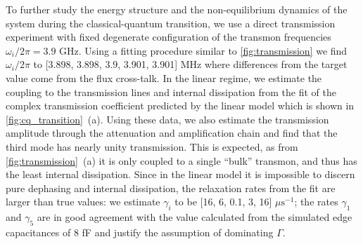\documentclass[%
 aps, prl,
 amsmath,amssymb,
 reprint,%
superscriptaddress
]{revtex4-2}
\begin{document}
To further study the energy structure and the non-equilibrium dynamics of the system during the classical-quantum transition, we use a direct transmission experiment with fixed degenerate configuration of the transmon frequencies $\omega_i/2\pi = 3.9$ GHz. Using a fitting procedure similar to \autoref{fig:transmission} we find $\omega_i/2\pi$ to [3.898, 3.898, 3.9, 3.901, 3.901] MHz where differences from the target value come from the flux cross-talk. In the linear regime, we estimate the coupling to the transmission lines and internal dissipation from the fit of the complex transmission coefficient predicted by the linear model which is shown in \autoref{fig:cq_transition}~(a). Using these data, we also estimate the transmission amplitude through the attenuation and amplification chain and find that the third mode has nearly unity transmission. This is expected, as from \autoref{fig:transmission}~(a) it is only coupled to a single ``bulk'' transmon, and thus has the least internal dissipation. Since in the linear model it is impossible to discern pure dephasing and internal dissipation, the relaxation rates from the fit are larger than true values: we estimate $\gamma_i$ to be [16, 6, 0.1,  3, 16] $\mu\text{s}^{-1}$; the rates $\gamma_1$ and $\gamma_5$ are in good agreement with the value calculated from the simulated edge capacitances of 8 fF and justify the assumption of dominating $\Gamma$.
\end{document}
